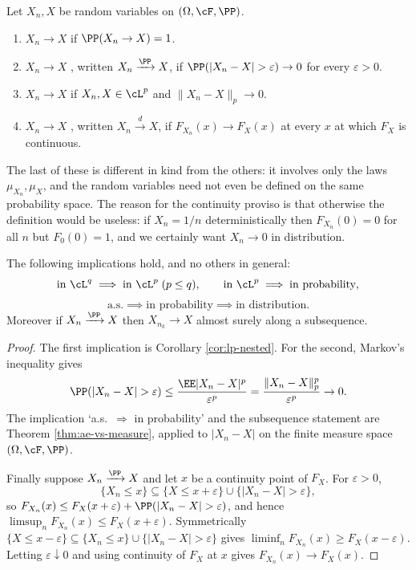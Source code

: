 \begin{definition}
	Let $X_n, X$ be random variables on $(\Omega,\cF,\PP)$.
	\begin{enumerate}[label=(\roman*)]
		\item $X_n \to X$  if $\PP(X_n \to X) = 1$.
		\item $X_n \to X$ , written $X_n \xrightarrow{\PP}X$, if $\PP(|X_n - X|>\varepsilon)\to 0$ for every $\varepsilon>0$.
		\item $X_n \to X$  if $X_n, X \in \cL^p$ and $\|X_n - X\|_p \to 0$.
		\item $X_n \to X$ , written $X_n \xrightarrow{d}X$, if $F_{X_n}(x)\to F_X(x)$ at every $x$ at which $F_X$ is continuous.
	\end{enumerate}
\end{definition}

The last of these is different in kind from the others: it involves only the laws $\mu_{X_n},\mu_X$, and the random variables need not even be defined on the same probability space. The reason for the continuity proviso is that otherwise the definition would be useless: if $X_n = 1/n$ deterministically then $F_{X_n}(0)=0$ for all $n$ but $F_0(0)=1$, and we certainly want $X_n \to 0$ in distribution.

\begin{theorem}\label{thm:modes}
	The following implications hold, and no others in general:
	$$
	\text{in }\cL^q \implies \text{in }\cL^p \; (p\leq q), \qquad \text{in }\cL^p \implies \text{in probability},
	$$
	$$
	\text{a.s.} \implies \text{in probability} \implies \text{in distribution}.
	$$
	Moreover if $X_n \xrightarrow{\PP}X$ then $X_{n_k}\to X$ almost surely along a subsequence.
\end{theorem}
\begin{proof}
	The first implication is Corollary \ref{cor:lp-nested}. For the second, Markov's inequality gives
	$$
	\PP(|X_n - X| > \varepsilon)\leq \frac{\EE|X_n-X|^p}{\varepsilon^p} = \frac{\|X_n-X\|_p^p}{\varepsilon^p}\to 0.
	$$
	The implication `a.s.\ $\Rightarrow$ in probability' and the subsequence statement are Theorem \ref{thm:ae-vs-measure}, applied to $|X_n - X|$ on the finite measure space $(\Omega,\cF,\PP)$.

	Finally suppose $X_n\xrightarrow{\PP}X$ and let $x$ be a continuity point of $F_X$. For $\varepsilon>0$,
	$$
	\{X_n \leq x\} \subseteq \{X \leq x+\varepsilon\}\cup\{|X_n - X|>\varepsilon\},
	$$
	so $F_{X_n}(x) \leq F_X(x+\varepsilon)+\PP(|X_n-X|>\varepsilon)$, and hence $\limsup_n F_{X_n}(x)\leq F_X(x+\varepsilon)$. Symmetrically $\{X\leq x - \varepsilon\}\subseteq\{X_n\leq x\}\cup\{|X_n-X|>\varepsilon\}$ gives $\liminf_n F_{X_n}(x)\geq F_X(x-\varepsilon)$. Letting $\varepsilon\downarrow 0$ and using continuity of $F_X$ at $x$ gives $F_{X_n}(x)\to F_X(x)$.
\end{proof}

